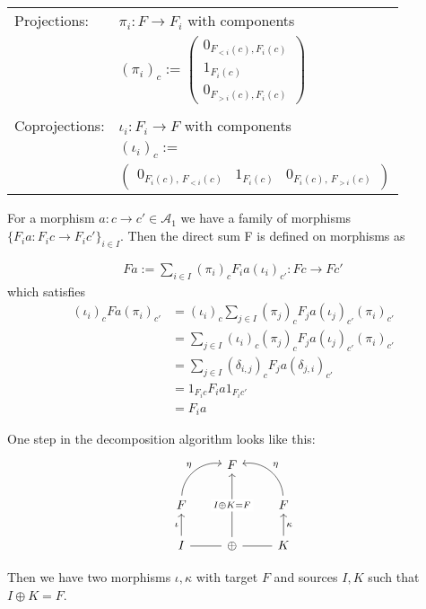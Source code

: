 \documentclass[12pt,compress]{beamer}
\begin{document}
\begin{frame}[fragile]
\begin{tabular}{p{}p{}}
Projections: & $\pi_{i} : F \rightarrow F_{i}$ with components \\
& $(\pi_{i})_{c} := \begin{pmatrix}
0_{F_{<i}(c), F_{i}(c)} \\[2pt]
1_{F_{i}(c)} \\[2pt]
0_{F_{>i}(c), F_{i}(c)}
\end{pmatrix}$ \\
& \\
Coprojections: & $\iota_{i} : F_{i} \rightarrow F$ with components \\
& $(\iota_{i})_{c} :=$ \\
& $\begin{pmatrix}
0_{F_{i}(c),\,F_{<i}(c)} & 1_{F_{i}(c)} & 0_{F_{i}(c),\,F_{>i}(c)}
\end{pmatrix}$
\end{tabular}
\end{frame}

\begin{frame}[fragile]
For a morphism $a : c \rightarrow c' \in \mathcal{A}_{1}$ we have a family of morphisms 
$\{F_{i} a : F_{i} c \rightarrow F_{i} c'\}_{i \in I}$. Then the direct sum F is defined on morphisms as

\begin{align*}
F a := \sum_{i \in I} (\pi_{i})_{c} F_{i} a (\iota_{i})_{c'} : Fc \rightarrow Fc'
\end{align*}
which satisfies
\begin{align*}
(\iota_{i})_{c} Fa (\pi_{i})_{c'} &= (\iota_{i})_{c} \sum_{j \in I} (\pi_{j})_{c} F_{j} a (\iota_{j})_{c'} (\pi_{i})_{c'} \\
&= \sum_{j \in I} (\iota_{i})_{c} (\pi_{j})_{c} F_{j} a (\iota_{j})_{c'}(\pi_{i})_{c'} \\
&= \sum_{j \in I} (\delta_{i,j})_{c} F_{j} a (\delta_{j,i})_{c'} \\
&= 1_{F_{i} c} F_{i} a 1_{F_{i} c'} \\
&= F_{i} a
\end{align*}
\end{frame}

\begin{frame}[fragile]
One step in the decomposition algorithm looks like this:
\[
\begin{tikzcd}
                                   & F                 &                                      \\
F \arrow[ru, "\eta", bend left=49] &                   & F \arrow[lu, "\eta"', bend right=49] \\
I \arrow[u, "\iota"] \arrow[r, dash]     & \oplus \arrow[uu, "I \oplus K = F" description] & K \arrow[u, "\kappa"'] \arrow[l, dash]    
\end{tikzcd}
\]

Then we have two morphisms $\iota, \kappa$ with target $F$ and sources $I, K$ such that $I \oplus K = F$.
\end{frame}
\end{document}
